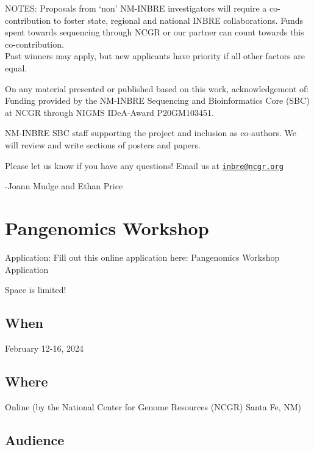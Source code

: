 \documentclass[
]{book}
\begin{document}
NOTES:
Proposals from `non' NM-INBRE investigators will require a co-contribution to foster state, regional and national INBRE collaborations. Funds spent towards sequencing through NCGR or our partner can count towards this co-contribution.\\
Past winners may apply, but new applicants have priority if all other factors are equal.

On any material presented or published based on this work, acknowledgement of:
Funding provided by the NM-INBRE Sequencing and Bioinformatics Core (SBC) at NCGR through NIGMS IDeA-Award P20GM103451.

NM-INBRE SBC staff supporting the project and inclusion as co-authors. We will review and write sections of posters and papers.

Please let us know if you have any questions! Email us at \href{mailto:inbre@ncgr.org}{\nolinkurl{inbre@ncgr.org}}

-Joann Mudge and Ethan Price

\hypertarget{pangenomics-workshop}{%
\chapter*{Pangenomics Workshop}\label{pangenomics-workshop}}

Application: Fill out this online application here: Pangenomics Workshop Application

Space is limited!

\hypertarget{when-1}{%
\section*{When}\label{when-1}}

February 12-16, 2024

\hypertarget{where-1}{%
\section*{Where}\label{where-1}}

Online (by the National Center for Genome Resources (NCGR) Santa Fe, NM)

\hypertarget{audience-1}{%
\section*{Audience}\label{audience-1}}
\end{document}
